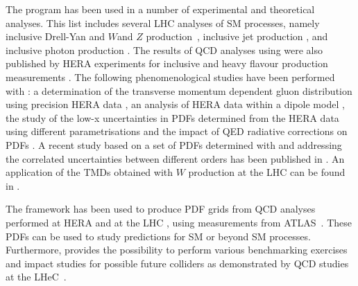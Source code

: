The \fitter program has been used in a number of experimental and theoretical analyses. 
This list includes several LHC analyses of SM processes, namely
inclusive Drell-Yan and $W$and $Z$ production~\cite{atlas:strange,cms:strange,atlas:hm,Aad:2014qja,Aad:2014xca}, 
inclusive jet production \cite{atlas:jets,Khachatryan:2014waa}, and inclusive photon production \cite{atlas:photons}.
The results of QCD analyses using \fitter were also
published by HERA experiments for inclusive \cite{h1zeus:2009wt,h1:2012kk} and
 heavy flavour production measurements \cite{h1zeus:charm, Abramowicz:2014zub}.
The following phenomenological studies have been performed with \fitter:
a determination of the transverse momentum dependent gluon distribution using precision HERA data \cite{Hautmann:2013tba}, 
an analysis of HERA data within a dipole model \cite{Luszczak:2013rxa},
the study of the low-x uncertainties in PDFs determined from the HERA data using 
different parametrisations \cite{Chebyshev} and the impact of QED radiative corrections on PDFs \cite{Sadykov:2014aua}.
A recent study based on a set of PDFs determined with \fitter and addressing 
the correlated uncertainties between different orders has been published in \cite{hfcorrpaper}. 
An application of the TMDs obtained with \fitter
$W$ production at the LHC can be found in \cite{Dooling:2014kia}.

The \fitter framework has been used to produce PDF grids from QCD analyses performed at 
HERA \cite{h1zeus:2009wt,hera:grids} and at the LHC \cite{atlas:grids}, using 
measurements from ATLAS~\cite{atlas:strange,atlas:jets}. These PDFs can be used to study predictions for SM 
or beyond SM processes. Furthermore, \fitter provides the possibility to perform various benchmarking exercises
\cite{Butterworth:2014efa} and impact studies for possible future colliders
as demonstrated by QCD studies at the LHeC~\cite{lhec:studies}.









